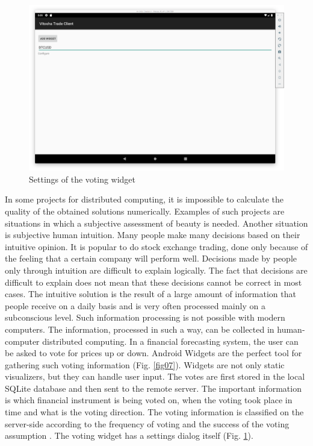 \documentclass[a4paper,conference]{IEEEtran}
\begin{document}
\begin{figure}[htbp]
\centerline{\includegraphics[width=1.0\linewidth]{fig08.png}}
\caption{Settings of the voting widget}
\label{fig08}
\end{figure}

In some projects for distributed computing, it is impossible to calculate the quality of the obtained solutions numerically. Examples of such projects are situations in which a subjective assessment of beauty is needed. Another situation is subjective human intuition. Many people make many decisions based on their intuitive opinion. It is popular to do stock exchange trading, done only because of the feeling that a certain company will perform well. Decisions made by people only through intuition are difficult to explain logically. The fact that decisions are difficult to explain does not mean that these decisions cannot be correct in most cases. The intuitive solution is the result of a large amount of information that people receive on a daily basis and is very often processed mainly on a subconscious level. Such information processing is not possible with modern computers. The information, processed in such a way, can be collected in human-computer distributed computing. In a financial forecasting system, the user can be asked to vote for prices up or down. Android Widgets are the perfect tool for gathering such voting information (Fig. \ref{fig07}). Widgets are not only static visualizers, but they can handle user input. The votes are first stored in the local SQLite database and then sent to the remote server. The important information is which financial instrument is being voted on, when the voting took place in time and what is the voting direction. The voting information is classified on the server-side according to the frequency of voting and the success of the voting assumption \cite{Ketipov-01}. The voting widget has a settings dialog itself (Fig. \ref{fig08}).
\end{document}

